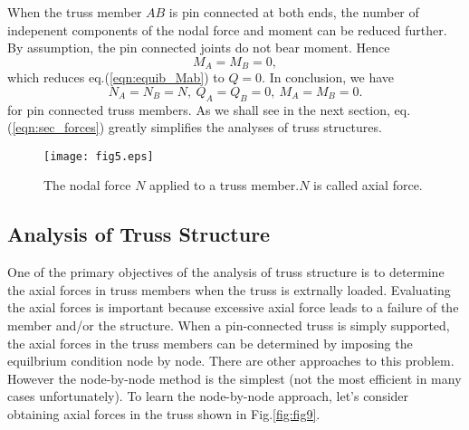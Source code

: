 \documentclass[10pt,a4j]{article}
\begin{document}
When the truss member $AB$ is pin connected at both ends, the 
number of indepenent components of the nodal force and moment can be reduced further. 
By assumption, the pin connected joints do not bear moment. Hence   
\begin{equation}
		M_A=M_B=0, 
	\label{eqn:}
\end{equation}
which reduces eq.(\ref{eqn:equib_Mab}) to $Q=0$.
In conclusion, we have 
\begin{equation}
	N_A=N_B=N,\  Q_A=Q_B=0, \  M_A=M_B=0.
	\label{eqn:sec_forces}
\end{equation}
for pin connected truss members.  
As we shall see in the next section, eq.(\ref{eqn:sec_forces}) greatly simplifies the analyses of truss structures. 
\begin{figure}[h]
	\begin{center}
	\texttt{[image: fig5.eps]} 
	\end{center}
	\caption{The nodal force $N$ applied to a truss member.$N$ is called axial force.}
	\label{fig:fig5}
\end{figure}
%
%
\subsection{Analysis of Truss Structure}
One of the primary objectives of the analysis of truss structure is to determine 
the axial forces in truss members when the truss is extrnally loaded. 
Evaluating the axial forces is important because excessive axial force leads to a  
failure of the member and/or the structure. When a pin-connected truss is simply supported, 
the axial forces in the truss members can be determined by imposing the equilbrium condition 
node by node. There are other approaches to this problem.  
However the node-by-node method is the simplest (not the most efficient in many cases unfortunately). 
To learn the node-by-node approach, let's consider obtaining axial forces in the truss shown in 
Fig.\ref{fig:fig9}.\\ 
\end{document}
